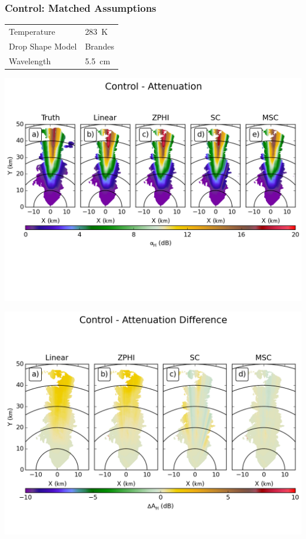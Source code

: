 \documentclass[red]{beamer}
\begin{document}
\begin{frame}
	\frametitle{Control: Matched Assumptions}
	\begin{center}
	    \begin{tabular}{ | l | l | }
	        \hline
	        Temperature & \SI{283}{\kelvin} \\
	        Drop Shape Model & Brandes \\
	        Wavelength & \SI{5.5}{\centi\meter} \\
			\hline
	    \end{tabular}
	\end{center}	
\end{frame}

\begin{frame}
	\begin{center}
		\includegraphics[scale=0.55]{figures/C_Control_Attenuation.png}
	\end{center}
\end{frame}

\begin{frame}
	\begin{center}
		\includegraphics[scale=0.45]{figures/C_Control_Attenuation_Difference.png}
	\end{center}
\end{frame}
\end{document}
